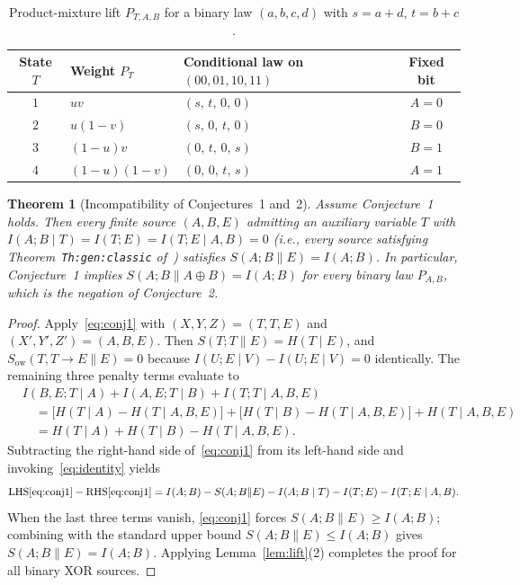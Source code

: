 \documentclass[11pt]{article}
\theoremstyle{plain}
\newtheorem{theorem}{Theorem}
\theoremstyle{definition}
\theoremstyle{remark}
\newcommand{\Sow}{S_{\mathrm{ow}}}
\begin{document}
\begin{table}[h]
\centering
\begin{tabular}{@{}cllc@{}}
\toprule
State $T$ & Weight $P_T$ & Conditional law on $(00, 01, 10, 11)$ & Fixed bit \\
\midrule
$1$ & $u v$ & $(s,\, t,\, 0,\, 0)$ & $A = 0$ \\
$2$ & $u(1 - v)$ & $(s,\, 0,\, t,\, 0)$ & $B = 0$ \\
$3$ & $(1 - u) v$ & $(0,\, t,\, 0,\, s)$ & $B = 1$ \\
$4$ & $(1 - u)(1 - v)$ & $(0,\, 0,\, t,\, s)$ & $A = 1$ \\
\bottomrule
\end{tabular}
\caption{Product-mixture lift $P_{T, A, B}$ for a binary law $(a, b, c, d)$ with $s = a + d$, $t = b + c$.}\label{tab:lift}
\end{table}

\begin{theorem}[Incompatibility of Conjectures~1 and~2]\label{thm:incomp}
Assume Conjecture~1 holds.
Then every finite source $(A, B, E)$ admitting an auxiliary variable $T$ with $I(A; B \mid T) = I(T; E) = I(T; E \mid A, B) = 0$ (i.e., every source satisfying Theorem~\texttt{Th:gen:classic} of~\cite{AbinGohari2026}) satisfies $S(A; B \| E) = I(A; B)$.
In particular, Conjecture~1 implies $S(A; B \| A \oplus B) = I(A; B)$ for every binary law $P_{A, B}$, which is the negation of Conjecture~2.
\end{theorem}

\begin{proof}
Apply~\eqref{eq:conj1} with $(X, Y, Z) = (T, T, E)$ and $(X', Y', Z') = (A, B, E)$.
Then $S(T; T \| E) = H(T \mid E)$, and $\Sow(T, T \to E \| E) = 0$ because $I(U; E \mid V) - I(U; E \mid V) = 0$ identically.
The remaining three penalty terms evaluate to
\begin{align*}
&I(B, E; T \mid A) + I(A, E; T \mid B) + I(T; T \mid A, B, E) \\
&\quad = \bigl[H(T \mid A) - H(T \mid A, B, E)\bigr]
  + \bigl[H(T \mid B) - H(T \mid A, B, E)\bigr] + H(T \mid A, B, E) \\
&\quad = H(T \mid A) + H(T \mid B) - H(T \mid A, B, E).
\end{align*}
Subtracting the right-hand side of~\eqref{eq:conj1} from its left-hand side and invoking~\eqref{eq:identity} yields
\[
\text{LHS}\eqref{eq:conj1} - \text{RHS}\eqref{eq:conj1}
= I(A; B) - S(A; B \| E) - I(A; B \mid T) - I(T; E) - I(T; E \mid A, B).
\]
When the last three terms vanish, \eqref{eq:conj1} forces $S(A; B \| E) \ge I(A; B)$; combining with the standard upper bound $S(A; B \| E) \le I(A; B)$ gives $S(A; B \| E) = I(A; B)$.
Applying Lemma~\ref{lem:lift}(2) completes the proof for all binary XOR sources.
\end{proof}
\end{document}

